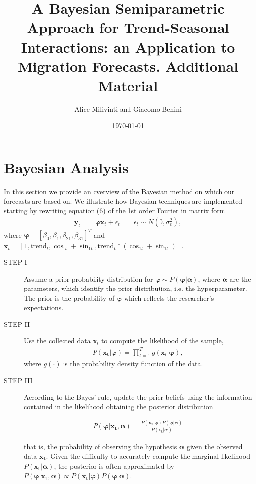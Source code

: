 \documentclass{article}\usepackage[]{graphicx}\usepackage[]{color}
\title{A Bayesian Semiparametric Approach for Trend-Seasonal Interactions: an Application to Migration Forecasts. Additional Material}
\author{Alice Milivinti and Giacomo Benini}
\date{\today}
\begin{document}
\maketitle
\onehalfspacing






\section{Bayesian Analysis}\label{bayesian analysis}

In this section we provide an overview of the Bayesian method on which our forecasts are based on. We illustrate how Bayesian techniques are implemented starting by rewriting equation (6) of the 1st order Fourier in matrix form 
\begin{align}\label{matrix_bayes}
\mathbf{y}_{t}&= \mathbf{\varphi} \mathbf{x}_{t}+\epsilon_{t} \quad \quad \epsilon_{t} \sim N(0, \sigma_{\epsilon}^{2}), 
\end{align}  
where $ \mathbf{\varphi}=[\beta_{0}, \beta_{1}, \beta_{21}, \beta_{31}]^{T}$ and  $ \mathbf{x}_{t}=[1, \text{trend}_{t}, \cos_{1t}+\sin_{1t}, \text{trend}_{t}*(\cos_{1t}+\sin_{1t})] $.
\begin{description}

\item[STEP I] Assume a prior probability distribution for $\mathbf{\varphi} \sim  P(\mathbf{\varphi | \alpha})$, where $\mathbf{\alpha}$ are the parameters, which identify the prior distribution, i.e. the hyperparameter. The prior is the probability of $\mathbf{\varphi}$ which reflects the researcher's expectations.

\item[STEP II] Use the collected data $\mathbf{x}_{t}$ to compute the likelihood of the sample,
\begin{align}\label{likelihood}
P(\mathbf{x_t | \mathbf{\varphi}}) = \prod_{t=1}^{T}g(\mathbf{x}_t| \mathbf{\varphi}),
\end{align}
where $ g(\cdot) $ is the probability density function of the data.

\item[STEP III] According to the Bayes' rule, update the prior beliefs using the information contained in the likelihood obtaining the posterior distribution

\begin{align}\label{posteriorr}
P(\mathbf{\varphi | x_t, \alpha}) = \frac{P(\mathbf{x_t | \varphi}) P(\mathbf{\varphi | \alpha})}{P(\mathbf{x_t | \alpha})}
\end{align}

that is, the probability of observing the hypothesis $\mathbf{\alpha}$ given the observed data $\mathbf{x_t} $.
Given the difficulty to accurately compute the marginal likelihood $ P(\mathbf{x_t | \alpha})$, the posterior is often approximated by $ P(\mathbf{\varphi | x_t, \alpha}) \propto P(\mathbf{x_t | \varphi}) P(\mathbf{\varphi | \alpha}) $.
\end{description}
\end{document}
